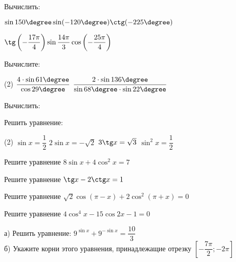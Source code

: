 %
%

\begin{class}[number=1]
	\begin{listofex}
		\item Вычислить:
		\begin{enumcols}[itemcolumns=2]
			\item \( \sin150\degree\sin(-120\degree)\ctg(-225\degree) \)
			\item \( \tg\left( -\dfrac{17\pi}{4} \right)\sin\dfrac{14\pi}{3} \cos\left( -\dfrac{25\pi}{4}\right)\ \)
		\end{enumcols}
		\item Вычислите:
		\begin{tasks}(2)
			\task \(\dfrac{4 \cdot \sin61\degree}{\cos29\degree}\)
			\task \(\dfrac{2 \cdot \sin136\degree}{\sin68\degree \cdot \sin22\degree}\)
		\end{tasks}
		\item Вычислить:
		\begin{enumcols}[itemcolumns=1]
			\item \exercise{1117}
			\item \exercise{1119}
		\end{enumcols}
		\item Решить уравнение:
		\begin{tasks}(2)
			\task \( \sin x = \dfrac{1}{2} \)
			\task \( 2\sin x = -\sqrt{2} \)
			\task \( 3\tg x = \sqrt{3} \)
			\task \( \sin^2 x = \dfrac{1}{2} \)
		\end{tasks}
		\item  Решите уравнение \( 8\sin x + 4\cos^2 x = 7 \)
		\item  Решите уравнение \( \tg x-2\ctg x=1 \)
		\item  Решите уравнение \( \sqrt{2}\cos {(\pi-x)} + 2\cos^2{(\pi+x)}=0 \)
		\item  Решите уравнение \( 4\cos^4 x - 15\cos 2x -1= 0 \)
		\item а) Решить уравнение: \( 9^{\sin x}+9^{-\sin x}=\dfrac{10}{3} \)\\
		б) Укажите корни этого уравнения, принадлежащие отрезку \( \left[ -\dfrac{7\pi}{2};-2\pi \right] \)

\end{listofex}
\end{class}
